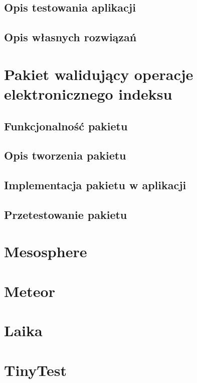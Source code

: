 \documentclass[brudnopis]{xmgr}
\begin{document}
\section{Opis testowania aplikacji}
\section{Opis własnych rozwiązań}


\chapter{Pakiet walidujący operacje elektronicznego indeksu}

\section{Funkcjonalność pakietu}
\section{Opis tworzenia pakietu}
\section{Implementacja pakietu w aplikacji}
\section{Przetestowanie pakietu}

\summary

\appendix
\chapter{Mesosphere}


\chapter{Meteor}


\chapter{Laika}


\chapter{TinyTest}


\cite{MeteorDocs}
\cite{NodeDocs}
\cite{MongoDocs}
\cite{Mesosphere}
\cite{DiscoverMeteor2013}
\cite{ScalingMongoDB2011}
\cite{ScalingWithMongoDB}
\cite{Laika}
\cite{TinyTest}
\cite{Introduction}




\listoftables

\listoffigures

\oswiadczenie
\end{document}
